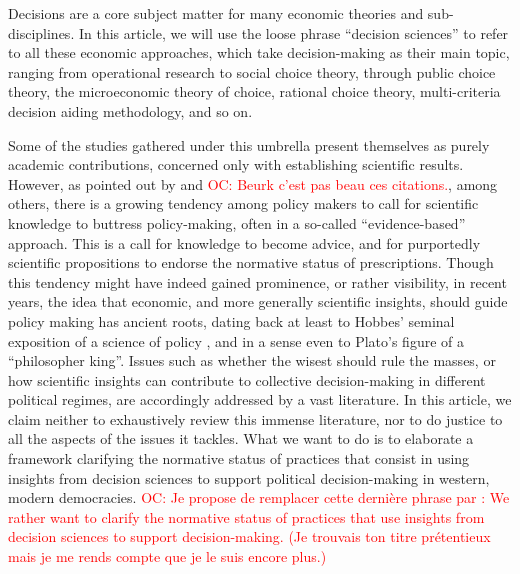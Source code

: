 \documentclass[preprint, french, english, 11pt]{elsarticle}%
\newcommand{\commentOC}[1]{\textcolor{red}{OC: #1}}
\begin{document}
\noindent Decisions are a core subject matter for many economic theories and sub-disciplines. In this article, we will use the loose phrase ``decision sciences'' to refer to all these economic approaches, which take decision-making as their main topic, ranging from operational research to social choice theory, through public choice theory, the microeconomic theory of choice, rational choice theory, multi-criteria decision aiding methodology, and so on.

Some of the studies gathered under this umbrella present themselves as purely academic contributions, concerned only with establishing scientific results. However, as pointed out by \cite{tsoukias_policy_2013} and \cite{marchi_evidence-based_2016} 
\commentOC{Beurk c’est pas beau ces citations.}, among others, there is a growing tendency among policy makers to call for scientific knowledge to buttress policy-making, often in a so-called ``evidence-based'' approach. This is a call for knowledge to become advice, and for purportedly scientific propositions to endorse the normative status of prescriptions. Though this tendency might have indeed gained prominence, or rather visibility, in recent years, the idea that economic, and more generally scientific insights, should guide policy making has ancient roots, dating back at least to Hobbes’ seminal exposition of a science of policy \citep{skinner_reason_1996}, and in a sense even to Plato's figure of a ``philosopher king''. Issues such as whether the wisest should rule the masses, or how scientific insights can contribute to collective decision-making in different political regimes, are accordingly addressed by a vast literature. In this article, we claim neither to exhaustively review this immense literature, nor to do justice to all the aspects of the issues it tackles. What we want to do is to elaborate a framework clarifying the normative status of practices that consist in using insights from decision sciences to support political decision-making in western, modern democracies. \commentOC{Je propose de remplacer cette dernière phrase par : We rather want to clarify the normative status of practices that use insights from decision sciences to support decision-making. (Je trouvais ton titre prétentieux mais je me rends compte que je le suis encore plus.)}
\end{document}

